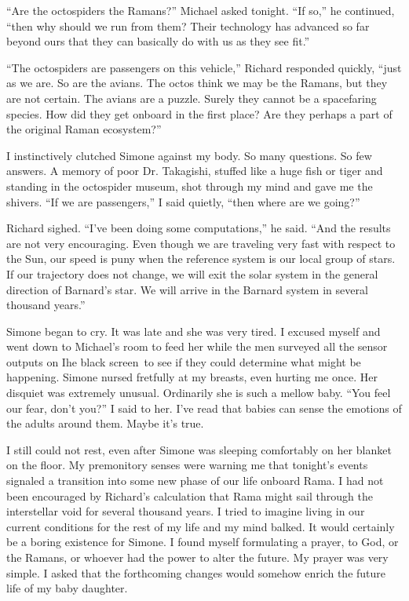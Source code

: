 \documentclass[]{article}
\begin{document}
“Are the octospiders the Ramans?” Michael asked tonight. “If so,” he continued, “then why should we run from them? Their technology has advanced so far beyond ours that they can basically do with us as they see fit.”

“The octospiders are passengers on this vehicle,” Richard responded quickly, “just as we are. So are the avians. The octos think we may be the Ramans, but they are not certain. The avians are a puzzle. Surely they cannot be a spacefaring species. How did they get onboard in the first place? Are they perhaps a part of the original Raman ecosystem?”

I instinctively clutched Simone against my body. So many questions. So few answers. A memory of poor Dr. Takagishi, stuffed like a huge fish or tiger and standing in the octospider museum, shot through my mind and gave me the shivers. “If we are passengers,” I said quietly, “then where are we going?”

Richard sighed. “I’ve been doing some computations,” he said. “And the results are not very encouraging. Even though we are traveling very fast with respect to the Sun, our speed is puny when the reference system is our local group of stars. If our trajectory does not change, we will exit the solar system in the general direction of Barnard’s star. We will arrive in the Barnard system in several thousand years.”

Simone began to cry. It was late and she was very tired. I excused myself and went down to Michael’s room to feed her while the men surveyed all the sensor outputs on Ihe black screen~to see if they could determine what might be happening. Simone nursed fretfully at my breasts, even hurting me once. Her disquiet was extremely unusual. Ordinarily she is such a mellow baby. “You feel our fear, don’t you?” I said to her. I’ve read that babies can sense the emotions of the adults around them. Maybe it’s true.

I still could not rest, even after Simone was sleeping comfortably on her blanket on the floor. My premonitory senses were warning me that tonight’s events signaled a transition into some new phase of our life onboard Rama. I had not been encouraged by Richard’s calculation that Rama might sail through the interstellar void for several thousand years. I tried to imagine living in our current conditions for the rest of my life and my mind balked. It would certainly be a boring existence for Simone. I found myself formulating a prayer, to God, or the Ramans, or whoever had the power to alter the future. My prayer was very simple. I asked that the forthcoming changes would somehow enrich the future life of my baby daughter.
\end{document}
